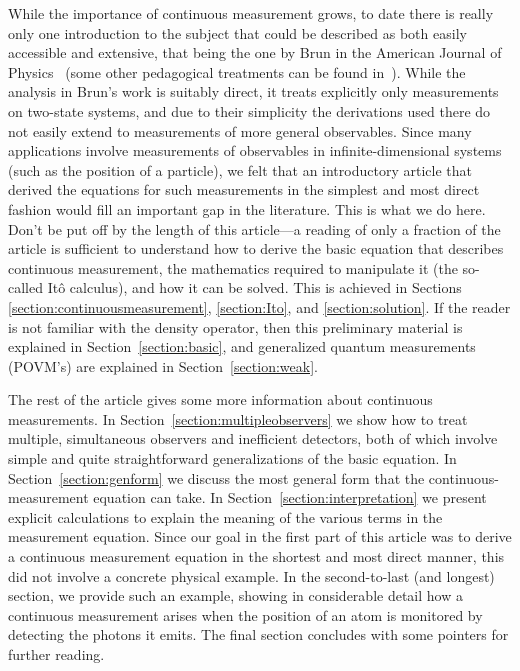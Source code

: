 \documentclass[aps,twocolumn,superscriptaddress,footinbib,floatfix,showpacs]{revtex4}
\begin{document}
While the importance of continuous measurement grows, to date there is 
really only one introduction to the subject that could be described as 
both easily accessible and extensive, that being the one by Brun in the 
American Journal of Physics~\cite{Brun02} (some other pedagogical treatments 
can be found in~\cite{Braginsky95,Carm93,WisemanLinQ}).  While the
analysis in Brun's work is suitably direct, it treats explicitly only
measurements on two-state systems, and due to their simplicity the
derivations used there do not easily extend to measurements of more
general observables.  Since many applications involve measurements of
observables in infinite-dimensional systems (such as the position of a
particle), we felt that an introductory article that derived the
equations for such measurements in the simplest and most direct
fashion would fill an important gap in the literature.  This is what we
do here.  Don't be put off by the length of this article---a reading
of only a fraction of the article is sufficient to understand how to
derive the basic equation that describes continuous measurement, the
mathematics required to manipulate it (the so-called It\^o calculus),
and how it can be solved.  This is achieved in Sections
\ref{section:continuousmeasurement}, \ref{section:Ito}, and
\ref{section:solution}.  If the reader is not familiar with the
density operator, then this preliminary material is explained in
Section~\ref{section:basic}, and generalized quantum measurements
(POVM's) are explained in Section~\ref{section:weak}.

The rest of the article gives some more information about continuous
measurements.  In Section~\ref{section:multipleobservers} we show how
to treat multiple, simultaneous observers and inefficient detectors,
both of which involve simple and quite straightforward generalizations
of the basic equation.  In Section~\ref{section:genform} we discuss
the most general form that the continuous-measurement equation can
take.  In Section~\ref{section:interpretation} we present explicit
calculations to explain the meaning of the various terms in the
measurement equation.  Since our goal in the first part of this
article was to derive a continuous measurement equation in the
shortest and most direct manner, this did not involve a concrete
physical example.  In the second-to-last (and longest) section, we
provide such an example, showing in considerable detail how a
continuous measurement arises when the position of an atom is
monitored by detecting the photons it emits.  The final section
concludes with some pointers for further reading.
\end{document}
